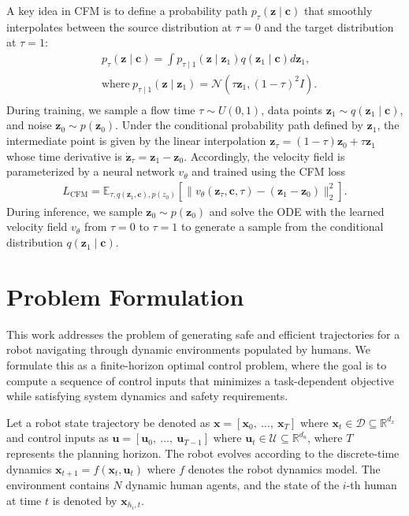 \documentclass[letterpaper,10 pt,conference]{ieeeconf}
\begin{document}
A key idea in CFM is to define a probability path $p_\tau(\mathbf{z}\mid\mathbf{c})$ that smoothly interpolates between the source distribution at $\tau = 0$ and the target distribution at $\tau = 1$:
\begin{equation}
\begin{aligned}
    &p_\tau(\mathbf{z} \mid \mathbf{c})=\int p_{\tau\mid1}(\mathbf{z} \mid \mathbf{z}_1)q(\mathbf{z}_1 \mid \mathbf{c})d\mathbf{z}_1,\\ 
    &\mathrm{where}\ p_{\tau \mid 1}(\mathbf{z} \mid \mathbf{z}_1)=\mathcal{N}(\tau\mathbf{z}_1, (1-\tau)^2I).\\
\end{aligned}
\label{eq:probability path}
\end{equation}
During training, we sample a flow time $\tau\sim U(0,1)$, data points $\mathbf{z}_1\sim q(\mathbf{z}_1 \mid \mathbf{c})$, and noise $\mathbf{z}_0\sim p(\mathbf{z}_0)$.
Under the conditional probability path defined by $\mathbf{z}_1$, the intermediate point is given by the linear interpolation $\mathbf{z}_\tau=(1-\tau)\mathbf{z}_0+\tau \mathbf{z}_1$ whose time derivative is $\dot{\mathbf{z}}_\tau=\mathbf{z}_1-\mathbf{z}_0$.
Accordingly, the velocity field is parameterized by a neural network  $v_\theta$ and trained using the CFM loss
\begin{align}\label{eq:cfm_loss}
    L_\mathrm{CFM}=\mathbb{E}_{\tau,q(\mathbf{z}_1,\mathbf{c}),p(z_0)}[\|v_\theta(\mathbf{z}_\tau,\mathbf{c},\tau) - (\mathbf{z}_1-\mathbf{z}_0)\|_2^2].
\end{align}
During inference, we sample $\mathbf{z}_0\sim p(\mathbf{z}_0)$ and solve the ODE with the learned velocity field $v_\theta$ from $\tau=0$ to $\tau=1$ to generate a sample from the conditional distribution $q(\mathbf{z}_1 \mid \mathbf{c})$.

\section{Problem Formulation} \label{sec:problem}
This work addresses the problem of generating safe and efficient trajectories for a robot navigating through dynamic environments populated by humans. 
We formulate this as a finite-horizon optimal control problem, where the goal is to compute a sequence of control inputs that minimizes a task-dependent objective while satisfying system dynamics and safety requirements.

Let a robot state trajectory be denoted as $\mathbf{x}=[\mathbf{x}_0,\ \ldots,\ \mathbf{x}_{T}]$ where $\mathbf{x}_t \in \mathcal{D}\subseteq\mathbb{R}^{d_x}$ and control inputs as $\mathbf{u}=[\mathbf{u}_0,\ \ldots,\ \mathbf{u}_{T-1}]$ where $\mathbf{u}_t \in \mathcal{U} \subseteq \mathbb{R}^{d_u}$, where $T$ represents the planning horizon.
The robot evolves according to the discrete-time dynamics $\mathbf{x}_{t+1}=f(\mathbf{x}_t, \mathbf{u}_t)$ where $f$ denotes the robot dynamics model.
The environment contains $N$ dynamic human agents, and the state of the $i$-th human at time $t$ is denoted by $\mathbf{x}_{h_i,t}$.
\end{document}
